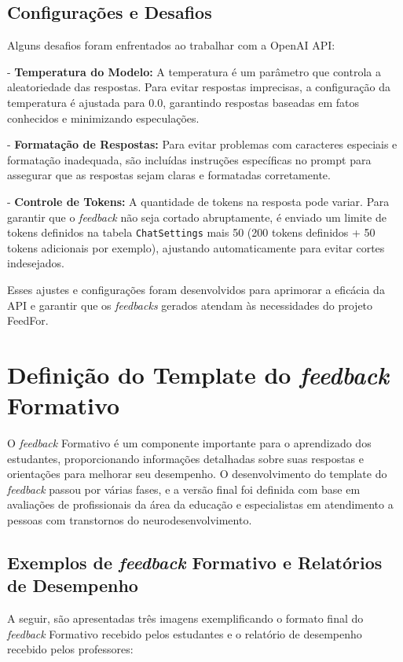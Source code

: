 \subsection{Configurações e Desafios}

Alguns desafios foram enfrentados ao trabalhar com a OpenAI API:

- \textbf{Temperatura do Modelo:} A temperatura é um parâmetro que controla a aleatoriedade das respostas. Para evitar respostas imprecisas, a configuração da temperatura é ajustada para 0.0, garantindo respostas baseadas em fatos conhecidos e minimizando especulações.

- \textbf{Formatação de Respostas:} Para evitar problemas com caracteres especiais e formatação inadequada, são incluídas instruções específicas no prompt para assegurar que as respostas sejam claras e formatadas corretamente.

- \textbf{Controle de Tokens:} A quantidade de tokens na resposta pode variar. Para garantir que o \textit{feedback} não seja cortado abruptamente, é enviado um limite de tokens definidos na tabela \texttt{ChatSettings} mais 50 (200 tokens definidos + 50 tokens adicionais por exemplo), ajustando automaticamente para evitar cortes indesejados.

Esses ajustes e configurações foram desenvolvidos para aprimorar a eficácia da API e garantir que os \textit{feedbacks} gerados atendam às necessidades do projeto FeedFor.

\section{Definição do Template do \textit{feedback} Formativo}

O \textit{feedback} Formativo é um componente importante para o aprendizado dos estudantes, proporcionando informações detalhadas sobre suas respostas e orientações para melhorar seu desempenho. O desenvolvimento do template do \textit{feedback} passou por várias fases, e a versão final foi definida com base em avaliações de profissionais da área da educação e especialistas em atendimento a pessoas com transtornos do neurodesenvolvimento.

\subsection{Exemplos de \textit{feedback} Formativo e Relatórios de Desempenho}

A seguir, são apresentadas três imagens exemplificando o formato final do \textit{feedback} Formativo recebido pelos estudantes e o relatório de desempenho recebido pelos professores:

